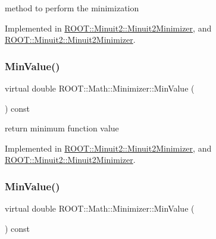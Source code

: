 method to perform the minimization 



Implemented in \mbox{\hyperlink{classROOT_1_1Minuit2_1_1Minuit2Minimizer_af5d2da195d2b1a7eac6d9b8859eec2b9}{R\+O\+O\+T\+::\+Minuit2\+::\+Minuit2\+Minimizer}}, and \mbox{\hyperlink{classROOT_1_1Minuit2_1_1Minuit2Minimizer_af5d2da195d2b1a7eac6d9b8859eec2b9}{R\+O\+O\+T\+::\+Minuit2\+::\+Minuit2\+Minimizer}}.

\mbox{\label{classROOT_1_1Math_1_1Minimizer_ae4845ff42bc0e244fdfa068c53b9a965}} 
\subsubsection{\texorpdfstring{MinValue()}{MinValue()}\hspace{0.1cm}{\footnotesize\ttfamily [1/2]}}
{\footnotesize\ttfamily virtual double R\+O\+O\+T\+::\+Math\+::\+Minimizer\+::\+Min\+Value (\begin{DoxyParamCaption}{ }\end{DoxyParamCaption}) const\hspace{0.3cm}{\ttfamily [pure virtual]}}



return minimum function value 



Implemented in \mbox{\hyperlink{classROOT_1_1Minuit2_1_1Minuit2Minimizer_a4a1c7fc174527aefab3d8c87bf8c0672}{R\+O\+O\+T\+::\+Minuit2\+::\+Minuit2\+Minimizer}}, and \mbox{\hyperlink{classROOT_1_1Minuit2_1_1Minuit2Minimizer_a4a1c7fc174527aefab3d8c87bf8c0672}{R\+O\+O\+T\+::\+Minuit2\+::\+Minuit2\+Minimizer}}.

\mbox{\label{classROOT_1_1Math_1_1Minimizer_ae4845ff42bc0e244fdfa068c53b9a965}} 
\subsubsection{\texorpdfstring{MinValue()}{MinValue()}\hspace{0.1cm}{\footnotesize\ttfamily [2/2]}}
{\footnotesize\ttfamily virtual double R\+O\+O\+T\+::\+Math\+::\+Minimizer\+::\+Min\+Value (\begin{DoxyParamCaption}{ }\end{DoxyParamCaption}) const\hspace{0.3cm}{\ttfamily [pure virtual]}}



